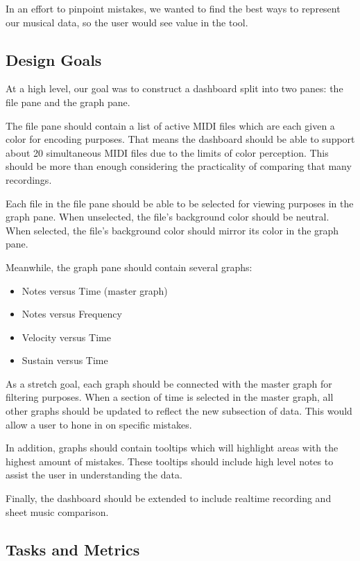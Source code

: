 \documentclass[journal]{vgtc}                %
\begin{document}
In an effort to pinpoint mistakes, we wanted to find the best ways to
represent our musical data, so the user would see value in the tool.

\subsection{Design Goals}

At a high level, our goal was to construct a dashboard split into two panes: the
file pane and the graph pane.

The file pane should contain a list of active MIDI files which are each given a
color for encoding purposes. That means the dashboard should be able to support
about 20 simultaneous MIDI files due to the limits of color perception. This
should be more than enough considering the practicality of comparing that many
recordings.

Each file in the file pane should be able to be selected for viewing purposes
in the graph pane. When unselected, the file's background color should be neutral.
When selected, the file's background color should mirror its color in the graph
pane.

Meanwhile, the graph pane should contain several graphs:

\begin{itemize}
  \item Notes versus Time (master graph)
  \item Notes versus Frequency
  \item Velocity versus Time
  \item Sustain versus Time
\end{itemize}

As a stretch goal, each graph should be connected with the master graph for
filtering purposes. When a section of time is selected in the master graph,
all other graphs should be updated to reflect the new subsection of data. This
would allow a user to hone in on specific mistakes.

In addition, graphs should contain tooltips which will highlight areas with
the highest amount of mistakes. These tooltips should include high level notes
to assist the user in understanding the data.

Finally, the dashboard should be extended to include realtime recording and sheet
music comparison.

\subsection{Tasks and Metrics}
\end{document}
